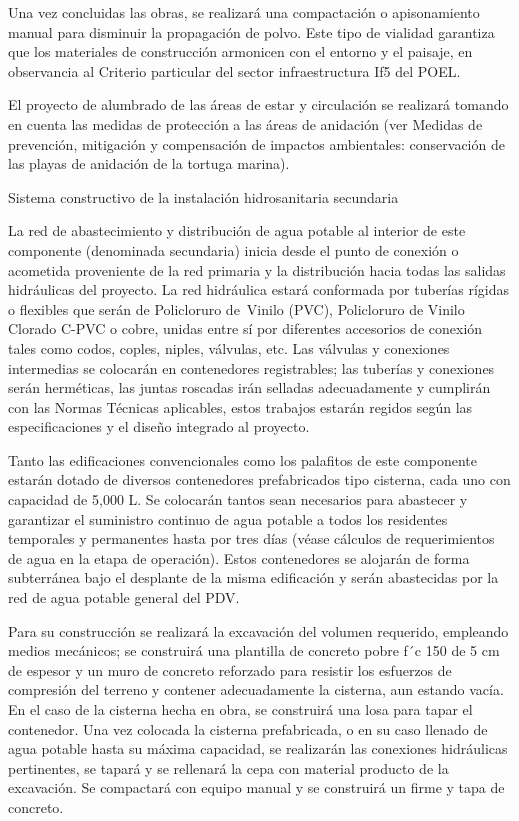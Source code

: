 \documentclass{article}
\begin{document}
Una vez concluidas las obras, se realizará una compactación o apisonamiento manual para disminuir la propagación de polvo. Este tipo de vialidad garantiza que los materiales de construcción armonicen con el entorno y el paisaje, en observancia al Criterio particular del sector infraestructura If5 del POEL. 

El proyecto de alumbrado de las áreas de estar y circulación se realizará tomando en cuenta las medidas de protección a las áreas de anidación (ver Medidas de prevención, mitigación y compensación de impactos ambientales: conservación de las playas de anidación de la tortuga marina).


\bigskip


\bigskip

Sistema constructivo de la instalación hidrosanitaria secundaria


\bigskip

La red de abastecimiento y distribución de agua potable al interior de este componente (denominada secundaria) inicia desde el punto de conexión o acometida proveniente de la red primaria y la distribución hacia todas las salidas hidráulicas del proyecto. La red hidráulica estará conformada por tuberías rígidas o flexibles que serán de Policloruro de~Vinilo (PVC), Policloruro de Vinilo Clorado C-PVC o cobre, unidas entre sí por diferentes accesorios de conexión tales como codos, coples, niples, válvulas, etc. Las válvulas y conexiones intermedias se colocarán en contenedores registrables; las tuberías y conexiones serán herméticas, las juntas roscadas irán selladas adecuadamente y cumplirán con las Normas Técnicas aplicables, estos trabajos estarán regidos según las especificaciones y el diseño integrado al proyecto. 


\bigskip

Tanto las edificaciones convencionales como los palafitos de este componente estarán dotado de diversos contenedores prefabricados tipo cisterna, cada uno con capacidad de 5,000 L. Se colocarán tantos sean necesarios para abastecer y garantizar el suministro continuo de agua potable a todos los residentes temporales y permanentes hasta por tres días (véase cálculos de requerimientos de agua en la etapa de operación). Estos contenedores se alojarán de forma subterránea bajo el desplante de la misma edificación y serán abastecidas por la red de agua potable general del PDV.


\bigskip

Para su construcción se realizará la excavación del volumen requerido, empleando medios mecánicos; se construirá una plantilla de concreto pobre f´c 150 de 5 cm de espesor y un muro de concreto reforzado para resistir los esfuerzos de compresión del terreno y contener adecuadamente la cisterna, aun estando vacía. En el caso de la cisterna hecha en obra, se construirá una losa para tapar el contenedor. Una vez colocada la cisterna prefabricada, o en su caso llenado de agua potable hasta su máxima capacidad, se realizarán las conexiones hidráulicas pertinentes, se tapará y se rellenará la cepa con material producto de la excavación. Se compactará con equipo manual y se construirá un firme y tapa de concreto.
\end{document}
